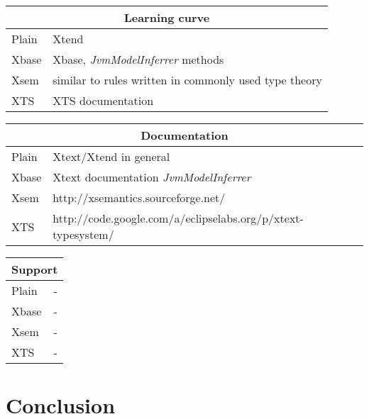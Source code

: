 \begin{tabularx}{\linewidth}{ l   X }
\multicolumn{2}{c}{Learning curve} \\ \hline
Plain & Xtend \\
Xbase & Xbase, \emph{JvmModelInferrer} methods \\
Xsem & similar to rules written in commonly used type theory \\
XTS & XTS documentation \\
\end{tabularx}

\begin{tabularx}{\linewidth}{ l   X }
\multicolumn{2}{c}{Documentation} \\ \hline
Plain & Xtext/Xtend in general \\
Xbase & Xtext documentation \emph{JvmModelInferrer} \\
Xsem & http://xsemantics.sourceforge.net/ \\
XTS & http://code.google.com/a/eclipselabs.org/p/xtext-typesystem/ \\
\end{tabularx}

\begin{tabularx}{\linewidth}{ l   X }
\multicolumn{2}{c}{Support} \\ \hline
Plain & - \\
Xbase & - \\
Xsem & - \\
XTS & - \\
\end{tabularx}


 \section{Conclusion}
